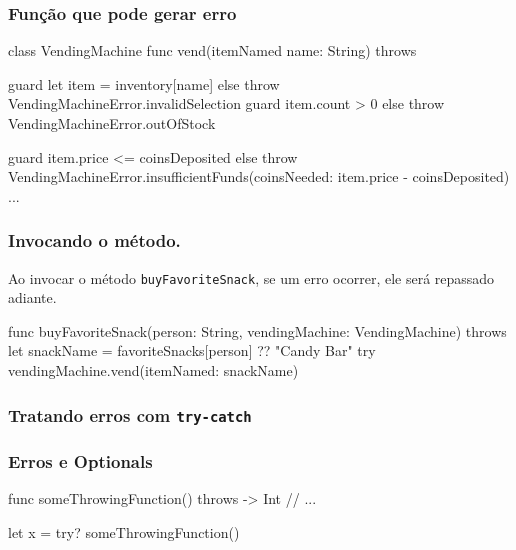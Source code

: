 \begin{frame}[fragile]
    \frametitle{Função que pode gerar erro}
    \begin{swift}
    class VendingMachine {}
        func vend(itemNamed name: String) throws {
            guard let item = inventory[name] else {
                throw VendingMachineError.invalidSelection
            }
            guard item.count > 0 else {
                throw VendingMachineError.outOfStock
            }

            guard item.price <= coinsDeposited else {
                throw VendingMachineError.insufficientFunds(coinsNeeded: item.price - coinsDeposited)
            }
            ...
        }
    \end{swift}
\end{frame}

\begin{frame}[fragile]
    \frametitle{Invocando o método.}
    Ao invocar o método \texttt{buyFavoriteSnack}, se um erro ocorrer,
    ele será repassado adiante.

    \begin{swift}
    func buyFavoriteSnack(person: String, vendingMachine: VendingMachine) throws {
        let snackName = favoriteSnacks[person] ?? "Candy Bar"
        try vendingMachine.vend(itemNamed: snackName)
    }
    \end{swift}
\end{frame}

\begin{frame}[fragile]
    \frametitle{Tratando erros com \texttt{try-catch}}
\end{frame}

\begin{frame}[fragile]
    \frametitle{Erros e Optionals}

    \begin{swift}
    func someThrowingFunction() throws -> Int {
        // ...
    }

    let x = try? someThrowingFunction()
    \end{swift}

\end{frame}

